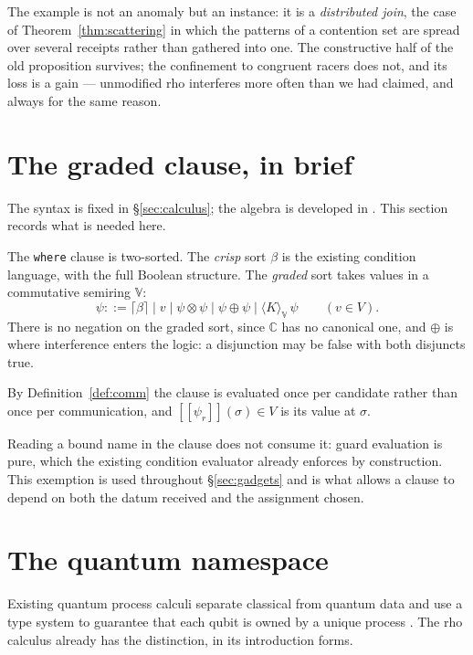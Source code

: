 \documentclass[11pt,a4paper]{article}
\theoremstyle{plain}
\theoremstyle{definition}
\theoremstyle{remark}
\newcommand{\sem}[1]{[\![#1]\!]}
\newcommand{\V}{\mathbb{V}}
\newcommand{\Cx}{\mathbb{C}}
\newcommand{\tensorv}{\otimes}
\newcommand{\sumv}{\oplus}
\newcommand{\crisp}[1]{\lceil #1 \rceil}
\begin{document}
The example is not an anomaly but an instance: it is a \emph{distributed join},
the case of Theorem~\ref{thm:scattering} in which the patterns of a contention
set are spread over several receipts rather than gathered into one. The
constructive half of the old proposition survives; the confinement to congruent
racers does not, and its loss is a gain --- unmodified rho interferes more often
than we had claimed, and always for the same reason.

\section{The graded clause, in brief}\label{sec:design}

The syntax is fixed in \S\ref{sec:calculus}; the algebra is developed in
\cite{ResAlg}. This section records what is needed here.

The \texttt{where} clause is two-sorted. The \emph{crisp} sort $\beta$ is the
existing condition language, with the full Boolean structure. The \emph{graded}
sort takes values in a commutative semiring $\V$:
\[
  \psi ::= \crisp{\beta} \mid v \mid \psi \tensorv \psi \mid \psi \sumv \psi
  \mid \langle K \rangle_{\V}\,\psi \qquad (v \in V).
\]
There is no negation on the graded sort, since $\Cx$ has no canonical one, and
$\sumv$ is where interference enters the logic: a disjunction may be false with
both disjuncts true.

By Definition~\ref{def:comm} the clause is evaluated once per candidate rather
than once per communication, and $\sem{\psi_r}(\sigma) \in V$ is its value at
$\sigma$.

Reading a bound name in the clause does not consume it: guard evaluation is
pure, which the existing condition evaluator already enforces by construction.
This exemption is used throughout \S\ref{sec:gadgets} and is what allows a
clause to depend on both the datum received and the assignment chosen.

\section{The quantum namespace}\label{sec:namespace}

Existing quantum process calculi separate classical from quantum data and use a
type system to guarantee that each qubit is owned by a unique process
\cite{GayNagarajanCQP,GayNagarajanTypes}. The rho calculus already has the
distinction, in its introduction forms.
\end{document}
